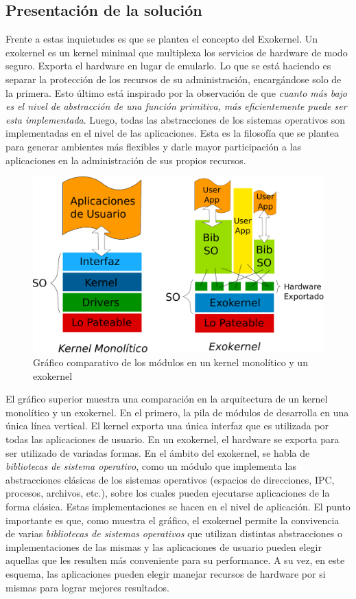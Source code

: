 \documentclass[10pt, a4paper]{article}
\begin{document}
\subsection{Presentación de la solución}
Frente a estas inquietudes es que se plantea el concepto del Exokernel. Un exokernel es un kernel minimal que multiplexa los servicios de hardware de modo seguro. Exporta el hardware en lugar de emularlo. Lo que se está haciendo es separar la protección de los recursos de su administración, encargándose solo de la primera. Esto último está inspirado por la observación de que \emph{cuanto más bajo es el nivel de abstracción de una función primitiva, más eficientemente puede ser esta implementada}. Luego, todas las abstracciones de los sistemas operativos son implementadas en el nivel de las aplicaciones. Esta es la filosofía que se plantea para generar ambientes más flexibles y darle mayor participación a las aplicaciones en la administración de sus propios recursos. 

\begin{figure}[H]
\centering
\includegraphics[scale=0.5]{grafico-kernel-exokernel.pdf}
\caption{Gráfico comparativo de los módulos en un kernel monolítico y un exokernel}
\end{figure}

El gráfico superior muestra una comparación en la arquitectura de un kernel monolítico y un exokernel. En el primero, la pila de módulos de desarrolla en una única línea vertical. El kernel exporta una única interfaz que es utilizada por todas las aplicaciones de usuario. En un exokernel, el hardware se exporta para ser utilizado de variadas formas. En el ámbito del exokernel, se habla de \emph{bibliotecas de sistema operativo}, como un módulo que implementa las abstracciones clásicas de los sistemas operativos (espacios de direcciones, IPC, procesos, archivos, etc.), sobre los cuales pueden ejecutarse aplicaciones de la forma clásica. Estas implementaciones se hacen en el nivel de aplicación. El punto importante es que, como muestra el gráfico, el exokernel permite la convivencia de varias \emph{bibliotecas de sistemas operativos} que utilizan distintas abstracciones o implementaciones de las mismas y las aplicaciones de usuario pueden elegir aquellas que les resulten más conveniente para su performance. A su vez, en este esquema, las aplicaciones pueden elegir manejar recursos de hardware por si mismas para lograr mejores resultados. 
\end{document}
